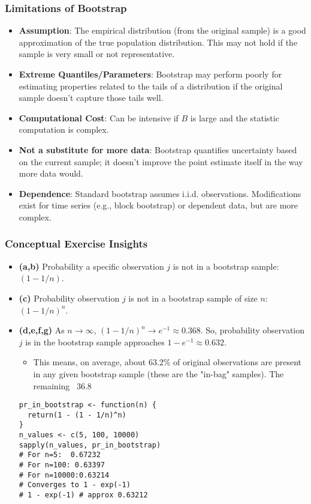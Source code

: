 \documentclass[12pt,a4paper]{article}
\begin{document}
\begin{itemize}
\begin{itemize}
\begin{itemize}
    \subsubsection{Limitations of Bootstrap}
        \begin{itemize}
            \item \textbf{Assumption}: The empirical distribution (from the original sample) is a good approximation of the true population distribution. This may not hold if the sample is very small or not representative.
            \item \textbf{Extreme Quantiles/Parameters}: Bootstrap may perform poorly for estimating properties related to the tails of a distribution if the original sample doesn't capture those tails well.
            \item \textbf{Computational Cost}: Can be intensive if $B$ is large and the statistic computation is complex.
            \item \textbf{Not a substitute for more data}: Bootstrap quantifies uncertainty based on the current sample; it doesn't improve the point estimate itself in the way more data would.
            \item \textbf{Dependence}: Standard bootstrap assumes i.i.d. observations. Modifications exist for time series (e.g., block bootstrap) or dependent data, but are more complex.
        \end{itemize}
    \subsubsection{Conceptual Exercise Insights }
        \begin{itemize}
            \item \textbf{(a,b)} Probability a specific observation $j$ is not in a bootstrap sample: $(1 - 1/n)$.
            \item \textbf{(c)} Probability observation $j$ is not in a bootstrap sample of size $n$: $(1 - 1/n)^n$.
            \item \textbf{(d,e,f,g)} As $n \to \infty$, $(1 - 1/n)^n \to e^{-1} \approx 0.368$. So, probability observation $j$ is in the bootstrap sample approaches $1 - e^{-1} \approx 0.632$.
                \begin{itemize}
                    \item This means, on average, about 63.2\% of original observations are present in any given bootstrap sample (these are the "in-bag" samples). The remaining ~36.8%
                \end{itemize}
\begin{lstlisting}[caption={Probability an Observation is in a Bootstrap Sample}]
pr_in_bootstrap <- function(n) {
  return(1 - (1 - 1/n)^n)
}
n_values <- c(5, 100, 10000)
sapply(n_values, pr_in_bootstrap)
# For n=5:  0.67232
# For n=100: 0.63397
# For n=10000:0.63214
# Converges to 1 - exp(-1)
# 1 - exp(-1) # approx 0.63212
\end{lstlisting}
        \end{itemize}

\end{itemize}
\end{itemize}
\end{itemize}
\end{document}
